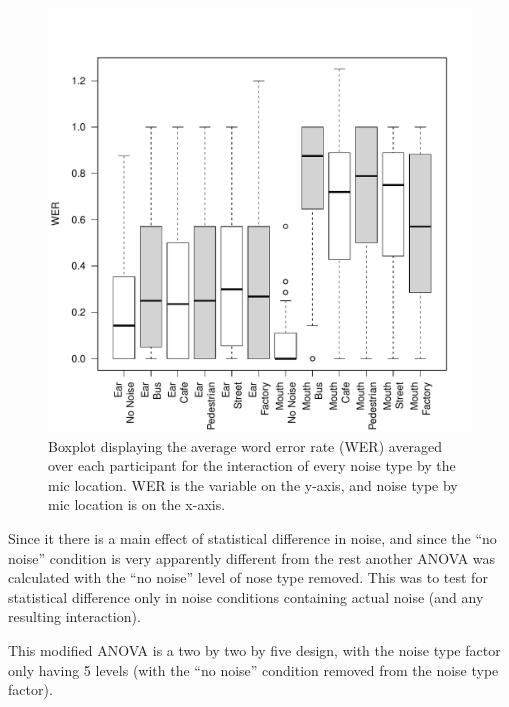 \documentclass[dissertation,copyright]{uathesis}
\makeatletter
\def\maxwidth{ %
  \ifdim\Gin@nat@width>\linewidth
    \linewidth
  \else
    \Gin@nat@width
  \fi
}
\makeatother
\begin{document}
\begin{figure}

\includegraphics[width=\maxwidth]{figure/boxplot_noiseXmic-1} 

\caption{Boxplot displaying the average word error rate (WER) averaged over each participant for the interaction of every noise type by the mic location. WER is the variable on the y-axis, and noise type by mic location is on the x-axis.}
\label{fig:anova1_noiseXmic_boxplot}
\end{figure}


Since it there is a main effect of statistical difference in noise, and since the ``no noise'' condition is very apparently different from the rest another ANOVA was calculated with the ``no noise'' level of nose type removed.  This was to test for statistical difference only in noise conditions containing actual noise (and any resulting interaction). 

This modified ANOVA is a two by two by five design, with the noise type factor only having 5 levels (with the ``no noise'' condition removed from the noise type factor).
\end{document}
